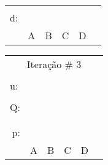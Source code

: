 \documentclass[16pt]{examdesign}
\begin{document}
\begin{fillin}[title={},
                    rearrange=no,resetcounter=no,suppressprefix]
\begin{question}
\begin{multicols}{4}
\begin{tabular}{|llllll|}
					    &                       &                       &                       &                       &  \\ \cline{2-5}
  \multicolumn{1}{|l|}{\multirow{2}{*}{d:}} & \multicolumn{1}{l|}{} & \multicolumn{1}{l|}{} & \multicolumn{1}{l|}{} & \multicolumn{1}{l|}{} &  \\
  \multicolumn{1}{|l|}{}                    & \multicolumn{1}{l|}{} & \multicolumn{1}{l|}{} & \multicolumn{1}{l|}{} & \multicolumn{1}{l|}{} &  \\ \cline{2-5}
					    & A                     & B                     & C                     & D                     &  \\ \hline
  \end{tabular}
  \begin{tabular}{|llllll|}
  \hline
  \multicolumn{6}{|c|}{Iteração \# 3}                                                                                                          \\
					    &                       &                       &                       &                       &  \\
  u:                                        &                       &                       &                       &                       &  \\ \cline{2-3}
					    &                       &                       &                       &                       &  \\ \cline{2-5}
  \multicolumn{1}{|r|}{Q:}                  & \multicolumn{1}{l|}{} & \multicolumn{1}{l|}{} & \multicolumn{1}{l|}{} & \multicolumn{1}{l|}{} &  \\
  \multicolumn{1}{|l|}{}                    & \multicolumn{1}{l|}{} & \multicolumn{1}{l|}{} & \multicolumn{1}{l|}{} & \multicolumn{1}{l|}{} &  \\ \cline{2-5}
					    &                       &                       &                       &                       &  \\ \cline{2-5}
  \multicolumn{1}{|r|}{\multirow{2}{*}{p:}} & \multicolumn{1}{l|}{} & \multicolumn{1}{l|}{} & \multicolumn{1}{l|}{} & \multicolumn{1}{l|}{} &  \\
  \multicolumn{1}{|r|}{}                    & \multicolumn{1}{l|}{} & \multicolumn{1}{l|}{} & \multicolumn{1}{l|}{} & \multicolumn{1}{l|}{} &  \\ \cline{2-5}
					    & A                     & B                     & C                     & D                     &  \\

\end{tabular}
\end{multicols}
\end{question}
\end{fillin}
\end{document}

